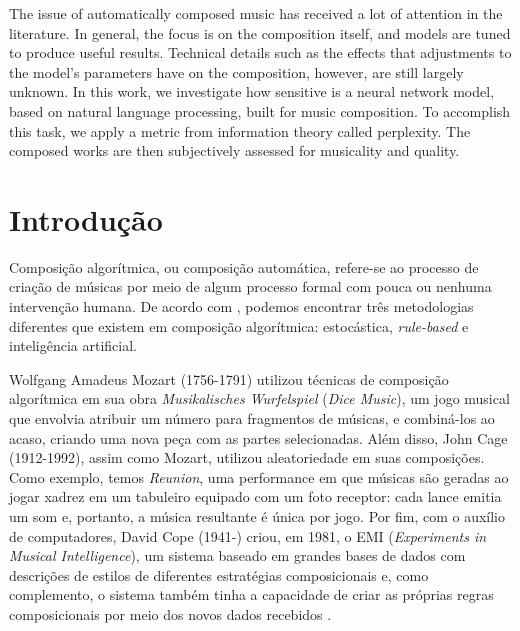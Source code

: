 \documentclass{automatextcc}
\begin{document}
\begin{englishabstract}
The issue of automatically composed music has received a lot of attention in the literature. In general, the focus is on the composition itself, and models are tuned to produce useful results. Technical details such as the effects that adjustments to the model's parameters have on the composition, however, are still largely unknown. In this work, we investigate how sensitive is a neural network model, based on natural language processing,  built for music composition. To accomplish this task, we apply a metric from information theory called perplexity. The composed works are then subjectively assessed for musicality and quality.
\end{englishabstract}

\tableofcontents

\listoffigures

\listoftables



\chapter{Introdução}
Composição algorítmica, ou composição automática, refere-se ao processo de criação de músicas por meio de algum processo formal com pouca ou nenhuma intervenção humana. De acordo com \citet{maurer}, podemos encontrar três metodologias diferentes que existem em composição algorítmica: estocástica, \textit{rule-based} e inteligência artificial.

Wolfgang Amadeus Mozart (1756-1791) utilizou técnicas de composição algorítmica em sua obra \textit{Musikalisches Wurfelspiel} (\textit{Dice Music}), um jogo musical que envolvia atribuir um número para fragmentos de músicas, e combiná-los ao acaso, criando uma nova peça com as partes selecionadas. Além disso, John Cage (1912-1992), assim como Mozart, utilizou aleatoriedade em suas composições. Como exemplo, temos \textit{Reunion}, uma performance em que músicas são geradas ao jogar xadrez em um tabuleiro equipado com um foto receptor: cada lance emitia um som e, portanto, a música resultante é única por jogo. Por fim, com o auxílio de computadores, David Cope (1941-) criou, em 1981, o EMI (\textit{Experiments in Musical Intelligence}), um sistema baseado em grandes bases de dados com descrições de estilos de diferentes estratégias composicionais e, como complemento, o sistema também tinha a capacidade de criar as próprias regras composicionais por meio dos novos dados recebidos \citep{alpern1995, maurer}. 
\end{document}
